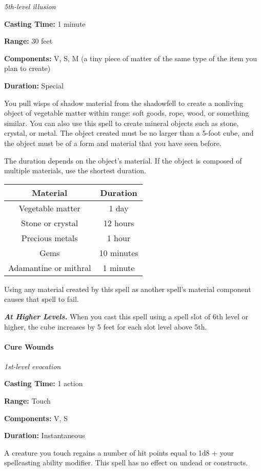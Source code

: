 \documentclass[
]{article}
\begin{document}
\emph{5th-level illusion}

\textbf{Casting Time:} 1 minute

\textbf{Range:} 30 feet

\textbf{Components:} V, S, M (a tiny piece of matter of the same type of
the item you plan to create)

\textbf{Duration:} Special

You pull wisps of shadow material from the shadowfell to create a
nonliving object of vegetable matter within range: soft goods, rope,
wood, or something similar. You can also use this spell to create
mineral objects such as stone, crystal, or metal. The object created
must be no larger than a 5-foot cube, and the object must be of a form
and material that you have seen before.

The duration depends on the object's material. If the object is composed
of multiple materials, use the shortest duration.

\begin{longtable}[]{@{}cc@{}}
\toprule
Material & Duration\tabularnewline
\midrule
\endhead
Vegetable matter & 1 day\tabularnewline
Stone or crystal & 12 hours\tabularnewline
Precious metals & 1 hour\tabularnewline
Gems & 10 minutes\tabularnewline
Adamantine or mithral & 1 minute\tabularnewline
\bottomrule
\end{longtable}

Using any material created by this spell as another spell's material
component causes that spell to fail.

\emph{\textbf{At Higher Levels.}} When you cast this spell using a spell
slot of 6th level or higher, the cube increases by 5 feet for each slot
level above 5th.

\hypertarget{cure-wounds}{%
\paragraph{Cure Wounds}\label{cure-wounds}}

\emph{1st-level evocation}

\textbf{Casting Time:} 1 action

\textbf{Range:} Touch

\textbf{Components:} V, S

\textbf{Duration:} Instantaneous

A creature you touch regains a number of hit points equal to 1d8 + your
spellcasting ability modifier. This spell has no effect on undead or
constructs.
\end{document}
